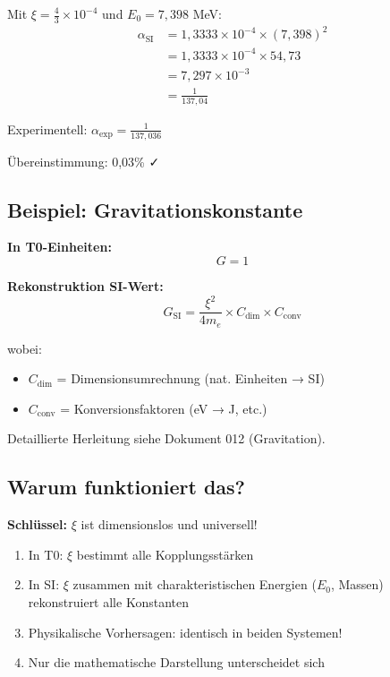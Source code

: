 	Mit $\xi = \frac{4}{3} \times 10^{-4}$ und $E_0 = 7{,}398$ MeV:
	\begin{align}
		\alpha_{\text{SI}} &= 1{,}3333 \times 10^{-4} \times (7{,}398)^2 \\
		&= 1{,}3333 \times 10^{-4} \times 54{,}73 \\
		&= 7{,}297 \times 10^{-3} \\
		&= \frac{1}{137{,}04}
	\end{align}
	
	Experimentell: $\alpha_{\text{exp}} = \frac{1}{137{,}036}$
	
	Übereinstimmung: 0{,}03\% ✓
	
	\subsection{Beispiel: Gravitationskonstante}
	
	\textbf{In T0-Einheiten:}
	\begin{equation}
		G = 1
	\end{equation}
	
	\textbf{Rekonstruktion SI-Wert:}
	\begin{equation}
		G_{\text{SI}} = \frac{\xi^2}{4m_e} \times C_{\text{dim}} \times C_{\text{conv}}
	\end{equation}
	
	wobei:
	\begin{itemize}
		\item $C_{\text{dim}}$ = Dimensionsumrechnung (nat. Einheiten → SI)
		\item $C_{\text{conv}}$ = Konversionsfaktoren (eV → J, etc.)
	\end{itemize}
	
	Detaillierte Herleitung siehe Dokument 012 (Gravitation).
	
	\subsection{Warum funktioniert das?}
	
	\textbf{Schlüssel:} $\xi$ ist dimensionslos und universell!
	
	\begin{enumerate}
		\item In T0: $\xi$ bestimmt alle Kopplungsstärken
		
		\item In SI: $\xi$ zusammen mit charakteristischen Energien ($E_0$, Massen) rekonstruiert alle Konstanten
		
		\item Physikalische Vorhersagen: identisch in beiden Systemen!
		
		\item Nur die mathematische Darstellung unterscheidet sich
	\end{enumerate}
	

